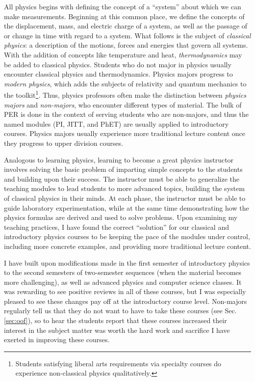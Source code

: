 \documentclass[../../main.tex]{subfiles}
\begin{document}
All physics begins with defining the concept of a ``system'' about which we can make measurements.  Beginning at this common place, we define the concepts of the displacement, mass, and electric charge of a system, as well as the passage of or change in time with regard to a system.  What follows is the subject of \textit{classical physics}: a description of the motions, forces and energies that govern all systems.  With the addition of concepts like temperature and heat, \textit{thermodynamics} may be added to classical physics.  Students who do not major in physics usually encounter classical physics and thermodynamics.  Physics majors progress to \textit{modern physics}, which adds the subjects of relativity and quantum mechanics to the toolkit\footnote{Students satisfying liberal arts requirements via specialty courses do experience non-classical physics qualitatively.}.  Thus, physics professors often make the distinction between \textit{physics majors} and \textit{non-majors}, who encounter different types of material.  The bulk of PER is done in the context of serving students who are non-majors, and thus the named modules (PI, JITT, and PhET) are usually applied to introductory courses.  Physics majors usually experience more traditional lecture content once they progress to upper division courses.  \\ \hspace{0.1cm}

Analogous to learning physics, learning to become a great physics instructor involves solving the basic problem of imparting simple concepts to the students and building upon their success.  The instructor must be able to generalize the teaching modules to lead students to more advanced topics, building the system of classical physics in their minds.  At each phase, the instructor must be able to guide laboratory experimentation, while at the same time demonstrating how the physics formulas are derived and used to solve problems.  Upon examining my teaching practices, I have found the correct ``solution'' for our classical and introductory physics courses to be keeping the pace of the modules under control, including more concrete examples, and providing more traditional lecture content.  \\ \hspace{0.1cm}

I have built upon modifications made in the first semester of introductory physics to the second semesters of two-semester sequences (when the material becomes more challenging), as well as advanced physics and computer science classes.  It was rewarding to see positive reviews in all of these courses, but I was especially pleased to see these changes pay off at the introductory course level.  Non-majors regularly tell us that they do not want to have to take these courses (see Sec. \ref{sec:oof}), so to hear the students report that these courses increased their interest in the subject matter was worth the hard work and sacrifice I have exerted in improving these courses.
\end{document}
